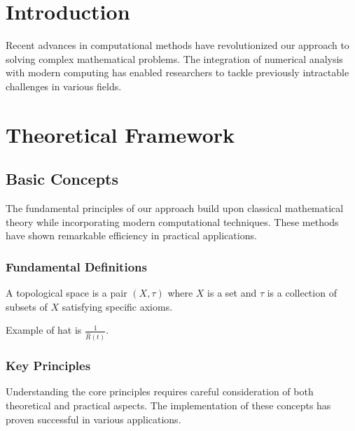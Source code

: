 
\maketitle
\tableofcontents
\newpage

\begin{abstract}
This is an example of a complex \LaTeX{} document containing various formatting elements, mathematical formulas, tables, figures, and code samples for testing translation programs. The document demonstrates multiple sectioning levels, cross-referencing, and advanced \LaTeX{} features.
\end{abstract}

\section{Introduction}
\label{sec:intro}
Recent advances in computational methods have revolutionized our approach to solving complex mathematical problems. The integration of numerical analysis with modern computing has enabled researchers to tackle previously intractable challenges in various fields.

\section{Theoretical Framework}
\label{sec:theory}

\subsection{Basic Concepts}
\label{subsec:basics}
The fundamental principles of our approach build upon classical mathematical theory while incorporating modern computational techniques. These methods have shown remarkable efficiency in practical applications.

\subsubsection{Fundamental Definitions}
\label{subsubsec:definitions}

\begin{definition}
A topological space is a pair $(X,\tau)$ where $X$ is a set and $\tau$ is a collection of subsets of $X$ satisfying specific axioms.
\end{definition}

Example of hat is $\frac{1}{\hat R(t)}$.

\subsubsection{Key Principles}
\label{subsubsec:principles}
Understanding the core principles requires careful consideration of both theoretical and practical aspects. The implementation of these concepts has proven successful in various applications.

